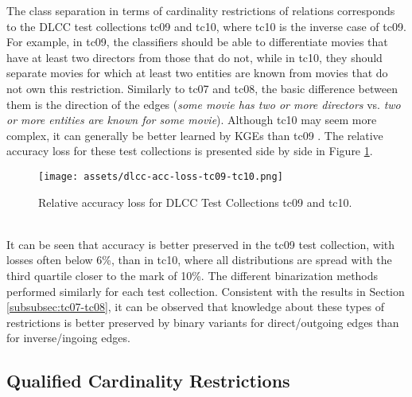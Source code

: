 \documentclass[11pt,titlepage,oneside,openany]{book}
\begin{document}
The class separation in terms of cardinality restrictions of relations corresponds to the DLCC test collections tc09 and tc10, where tc10 is the inverse case of tc09. For example, in tc09, the classifiers should be able to differentiate movies that have at least two directors from those that do not, while in tc10, they should separate movies for which at least two entities are known from movies that do not own this restriction. Similarly to tc07 and tc08, the basic difference between them is the direction of the edges (\textit{some movie has two or more directors} vs. \textit{two or more entities are known for some movie}). Although tc10 may seem more complex, it can generally be better learned by KGEs than tc09 \cite{portisch_rdf2vec_2023}. The relative accuracy loss for these test collections is presented side by side in Figure \ref{fig:dlcc-acc-loss-tc09-tc10}.\\
\begin{figure}[h!]
    \centering
    \centerline{\texttt{[image: assets/dlcc-acc-loss-tc09-tc10.png]}}
    \vspace*{-3mm}
    \caption{Relative accuracy loss for DLCC Test Collections tc09 and tc10.}
    \label{fig:dlcc-acc-loss-tc09-tc10}
\end{figure}
\\
It can be seen that accuracy is better preserved in the tc09 test collection, with losses often below 6\%, than in tc10, where all distributions are spread with the third quartile closer to the mark of 10\%. The different binarization methods performed similarly for each test collection. Consistent with the results in Section \ref{subsubsec:tc07-tc08}, it can be observed that knowledge about these types of restrictions is better preserved by binary variants for direct/outgoing edges than for inverse/ingoing edges.

\subsection{Qualified Cardinality Restrictions}
\label{subsubsec:tc11-tc12}
\end{document}
